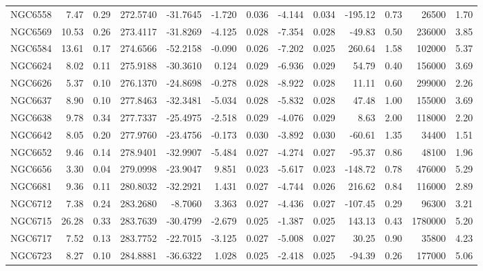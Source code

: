 \begin{longtable}{ | l | r | r| r | r | r | r | r | r | r | r | r | r  |}
            NGC6558       &   7.47 & 0.29 & 272.5740 & -31.7645 &  -1.720 & 0.036 &  -4.144 &  0.034 & -195.12 &  0.73 &   26500 &  1.70\\ 
            NGC6569       &  10.53 & 0.26 & 273.4117 & -31.8269 &  -4.125 & 0.028 &  -7.354 &  0.028 &  -49.83 &  0.50 &  236000 &  3.85\\ 
            NGC6584       &  13.61 & 0.17 & 274.6566 & -52.2158 &  -0.090 & 0.026 &  -7.202 &  0.025 &  260.64 &  1.58 &  102000 &  5.37\\ 
            NGC6624       &   8.02 & 0.11 & 275.9188 & -30.3610 &   0.124 & 0.029 &  -6.936 &  0.029 &   54.79 &  0.40 &  156000 &  3.69\\ 
            NGC6626       &   5.37 & 0.10 & 276.1370 & -24.8698 &  -0.278 & 0.028 &  -8.922 &  0.028 &   11.11 &  0.60 &  299000 &  2.26\\ 
            NGC6637       &   8.90 & 0.10 & 277.8463 & -32.3481 &  -5.034 & 0.028 &  -5.832 &  0.028 &   47.48 &  1.00 &  155000 &  3.69\\ 
            NGC6638       &   9.78 & 0.34 & 277.7337 & -25.4975 &  -2.518 & 0.029 &  -4.076 &  0.029 &    8.63 &  2.00 &  118000 &  2.20\\ 
            NGC6642       &   8.05 & 0.20 & 277.9760 & -23.4756 &  -0.173 & 0.030 &  -3.892 &  0.030 &  -60.61 &  1.35 &   34400 &  1.51\\ 
            NGC6652       &   9.46 & 0.14 & 278.9401 & -32.9907 &  -5.484 & 0.027 &  -4.274 &  0.027 &  -95.37 &  0.86 &   48100 &  1.96\\ 
            NGC6656       &   3.30 & 0.04 & 279.0998 & -23.9047 &   9.851 & 0.023 &  -5.617 &  0.023 & -148.72 &  0.78 &  476000 &  5.29\\ 
            NGC6681       &   9.36 & 0.11 & 280.8032 & -32.2921 &   1.431 & 0.027 &  -4.744 &  0.026 &  216.62 &  0.84 &  116000 &  2.89\\ 
            NGC6712       &   7.38 & 0.24 & 283.2680 &  -8.7060 &   3.363 & 0.027 &  -4.436 &  0.027 & -107.45 &  0.29 &   96300 &  3.21\\ 
            NGC6715       &  26.28 & 0.33 & 283.7639 & -30.4799 &  -2.679 & 0.025 &  -1.387 &  0.025 &  143.13 &  0.43 & 1780000 &  5.20\\ 
            NGC6717       &   7.52 & 0.13 & 283.7752 & -22.7015 &  -3.125 & 0.027 &  -5.008 &  0.027 &   30.25 &  0.90 &   35800 &  4.23\\ 
            NGC6723       &   8.27 & 0.10 & 284.8881 & -36.6322 &   1.028 & 0.025 &  -2.418 &  0.025 &  -94.39 &  0.26 &  177000 &  5.06\\ 

\end{longtable}
